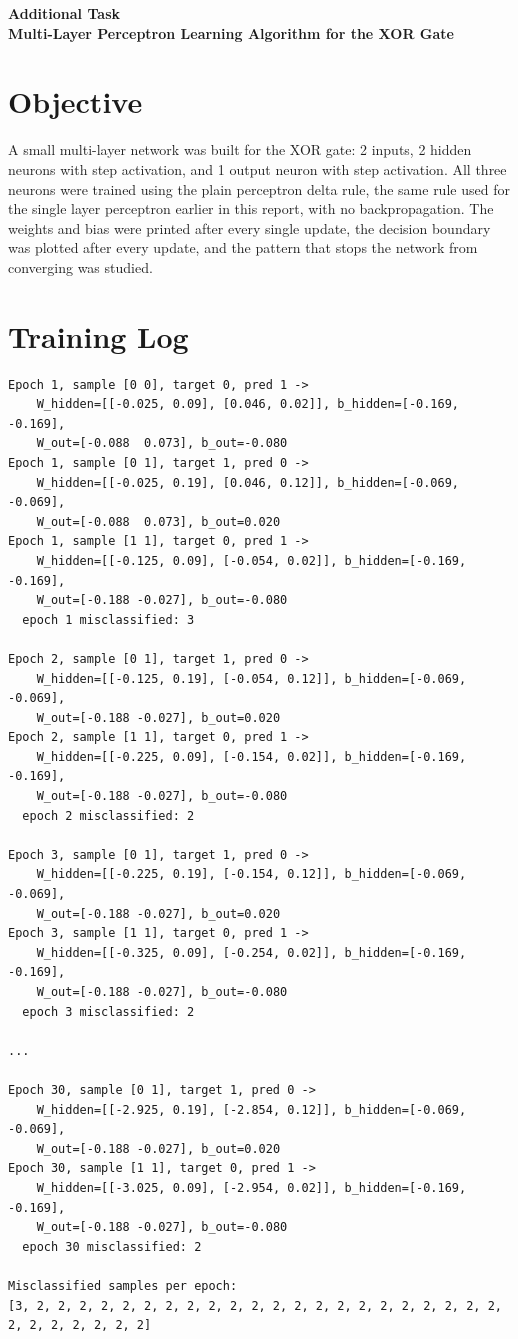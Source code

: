 \documentclass[11pt]{article}
\begin{document}
\begin{center}
{\large\textbf{Additional Task}}\\
{\large\textbf{Multi-Layer Perceptron Learning Algorithm for the XOR Gate}}
\end{center}

\section*{Objective}
A small multi-layer network was built for the XOR gate: 2 inputs, 2 hidden neurons with step
activation, and 1 output neuron with step activation. All three neurons were trained using the
plain perceptron delta rule, the same rule used for the single layer perceptron earlier in this
report, with no backpropagation. The weights and bias were printed after every single update, the
decision boundary was plotted after every update, and the pattern that stops the network from
converging was studied.

\section*{Training Log}
{\scriptsize
\begin{verbatim}
Epoch 1, sample [0 0], target 0, pred 1 ->
    W_hidden=[[-0.025, 0.09], [0.046, 0.02]], b_hidden=[-0.169, -0.169],
    W_out=[-0.088  0.073], b_out=-0.080
Epoch 1, sample [0 1], target 1, pred 0 ->
    W_hidden=[[-0.025, 0.19], [0.046, 0.12]], b_hidden=[-0.069, -0.069],
    W_out=[-0.088  0.073], b_out=0.020
Epoch 1, sample [1 1], target 0, pred 1 ->
    W_hidden=[[-0.125, 0.09], [-0.054, 0.02]], b_hidden=[-0.169, -0.169],
    W_out=[-0.188 -0.027], b_out=-0.080
  epoch 1 misclassified: 3

Epoch 2, sample [0 1], target 1, pred 0 ->
    W_hidden=[[-0.125, 0.19], [-0.054, 0.12]], b_hidden=[-0.069, -0.069],
    W_out=[-0.188 -0.027], b_out=0.020
Epoch 2, sample [1 1], target 0, pred 1 ->
    W_hidden=[[-0.225, 0.09], [-0.154, 0.02]], b_hidden=[-0.169, -0.169],
    W_out=[-0.188 -0.027], b_out=-0.080
  epoch 2 misclassified: 2

Epoch 3, sample [0 1], target 1, pred 0 ->
    W_hidden=[[-0.225, 0.19], [-0.154, 0.12]], b_hidden=[-0.069, -0.069],
    W_out=[-0.188 -0.027], b_out=0.020
Epoch 3, sample [1 1], target 0, pred 1 ->
    W_hidden=[[-0.325, 0.09], [-0.254, 0.02]], b_hidden=[-0.169, -0.169],
    W_out=[-0.188 -0.027], b_out=-0.080
  epoch 3 misclassified: 2

...

Epoch 30, sample [0 1], target 1, pred 0 ->
    W_hidden=[[-2.925, 0.19], [-2.854, 0.12]], b_hidden=[-0.069, -0.069],
    W_out=[-0.188 -0.027], b_out=0.020
Epoch 30, sample [1 1], target 0, pred 1 ->
    W_hidden=[[-3.025, 0.09], [-2.954, 0.02]], b_hidden=[-0.169, -0.169],
    W_out=[-0.188 -0.027], b_out=-0.080
  epoch 30 misclassified: 2

Misclassified samples per epoch:
[3, 2, 2, 2, 2, 2, 2, 2, 2, 2, 2, 2, 2, 2, 2, 2, 2, 2, 2, 2, 2, 2, 2, 2, 2, 2, 2, 2, 2, 2]
\end{verbatim}
}
\end{document}
